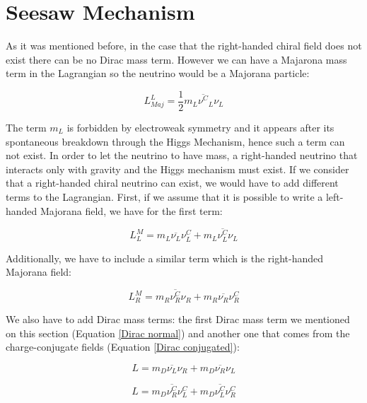 


\section{Seesaw Mechanism}

As it was mentioned before, in the case that the right-handed chiral field does not exist there can be no Dirac mass term. However we can have a Majarona mass term in the 
Lagrangian so the neutrino would be a Majorana particle:

\begin{equation}
L_{Maj}^{L} = \frac{1}{2} m_L \overline{\nu^{C}}_L \nu_L
\end{equation}

The term $m_L$ is forbidden by electroweak symmetry and it appears after its spontaneous breakdown through the Higgs Mechanism, hence such a term can not exist. In order to let the neutrino to have mass, a right-handed neutrino that interacts only with gravity and the Higgs mechanism must exist.
If we consider that a right-handed chiral neutrino can exist, we would have to add different terms to the Lagrangian. First, if 
we assume that it is possible to write a left-handed Majorana field, we have for the first term:

\begin{equation}
L_L^{M} = m_L \overline{\nu_L} \nu_{L}^C + m_L \overline{\nu_L^C} \nu_L
\end{equation}

Additionally, we have to include a similar term which is the right-handed Majorana field:

\begin{equation}
L_R^{M} = m_R \overline{\nu_R^C} \nu_{R} + m_R \overline{\nu_R} \nu_R^C
\end{equation}

We also have to add Dirac mass terms: the first Dirac mass term we mentioned on this section (Equation \ref{Dirac normal}) and another one that comes from the 
charge-conjugate fields (Equation \ref{Dirac conjugated}):

\begin{equation}\label{Dirac normal}
L = m_D \overline{\nu_L}\nu_R + m_D \overline{\nu_R}\nu_L
\end{equation} 

\begin{equation}\label{Dirac conjugated}
L = m_D \overline{\nu_R^C} \nu_L^C + m_D \overline{\nu_L^C}\nu_R^C
\end{equation} 

